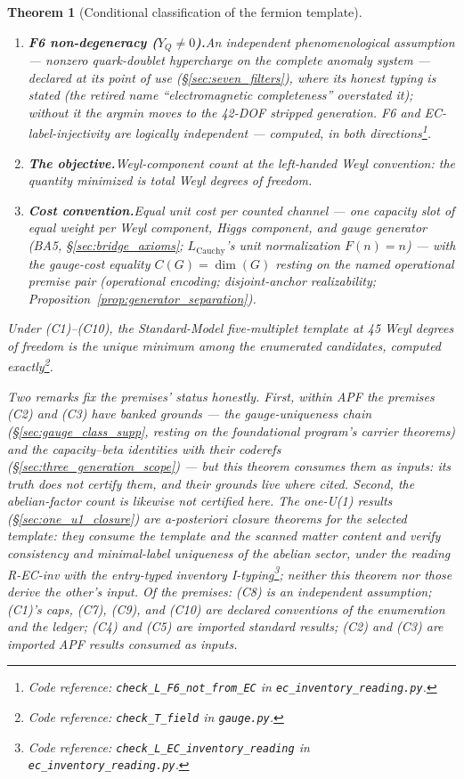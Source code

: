 \documentclass[11pt]{article}
\newtheorem{theorem}{Theorem}[section]
\theoremstyle{definition}
\newcommand{\coderef}[2]{\footnote{Code reference: \texttt{#1} in \texttt{#2}.}}
\begin{document}
\begin{theorem}[Conditional classification of the fermion template]
\begin{enumerate}[label=(C\arabic*),nosep]
  \item \textbf{F6 non-degeneracy ($Y_Q \neq 0$).}\quad An
  independent phenomenological assumption --- nonzero quark-doublet
  hypercharge on the complete anomaly system --- declared at its point
  of use (\S\ref{sec:seven_filters}), where its honest typing is
  stated (the retired name ``electromagnetic completeness'' overstated
  it); without it the argmin moves to the 42-DOF stripped generation.
  F6 and EC-label-injectivity are logically independent --- computed,
  in both directions\coderef{check\_L\_F6\_not\_from\_EC}{ec\_inventory\_reading.py}.
  \item \textbf{The objective.}\quad Weyl-component count at the
  left-handed Weyl convention: the quantity minimized is total Weyl
  degrees of freedom.
  \item \textbf{Cost convention.}\quad Equal unit cost per counted
  channel --- one capacity slot of equal weight per Weyl component,
  Higgs component, and gauge generator (BA5,
  \S\ref{sec:bridge_axioms}; $L_{\mathrm{Cauchy}}$'s unit
  normalization $F(n)=n$) --- with the gauge-cost equality
  $C(G) = \dim(G)$ resting on the named operational premise pair
  (operational encoding; disjoint-anchor realizability;
  Proposition~\ref{prop:generator_separation}).
\end{enumerate}
Under (C1)--(C10), the Standard-Model five-multiplet template at 45
Weyl degrees of freedom is the unique minimum among the enumerated
candidates, computed
exactly\coderef{check\_T\_field}{gauge.py}.

Two remarks fix the premises' status honestly.  First, within APF the
premises (C2) and (C3) have banked grounds --- the gauge-uniqueness
chain (\S\ref{sec:gauge_class_supp}, resting on the foundational
program's carrier theorems) and the capacity--beta identities with
their coderefs (\S\ref{sec:three_generation_scope}) --- but this
theorem consumes them as \emph{inputs}: its truth does not certify
them, and their grounds live where cited.  Second, the abelian-factor
count is likewise not certified here.  The one-U(1) results
(\S\ref{sec:one_u1_closure}) are a-posteriori closure theorems for
the selected template: they consume the template and the scanned
matter content and verify consistency and minimal-label uniqueness of
the abelian sector, under the reading R-EC-inv with the entry-typed
inventory
I-typing\coderef{check\_L\_EC\_inventory\_reading}{ec\_inventory\_reading.py};
neither this theorem nor those derive the other's input.  Of the
premises: (C8) is an independent assumption; (C1)'s caps, (C7), (C9),
and (C10) are declared conventions of the enumeration and the ledger;
(C4) and (C5) are imported standard results; (C2) and (C3) are
imported APF results consumed as inputs.
\end{theorem}
\end{document}

